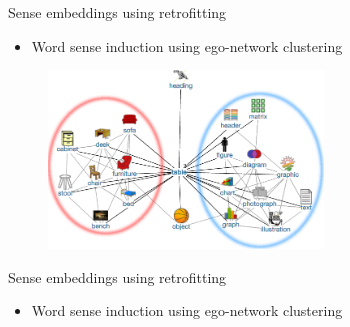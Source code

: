 \documentclass{beamer}
\begin{document}
\begin{frame}{Sense embeddings using retrofitting}

\begin{itemize}
\item Word sense induction using  ego-network clustering
\end{itemize} 
	
\centering
\begin{figure}
\includegraphics[width=0.65\textwidth]{table}
\end{figure}

\end{frame}


\begin{frame}{Sense embeddings using retrofitting}


\begin{itemize}
\item Word sense induction using  ego-network clustering
\end{itemize} 

\end{frame}
\end{document}
